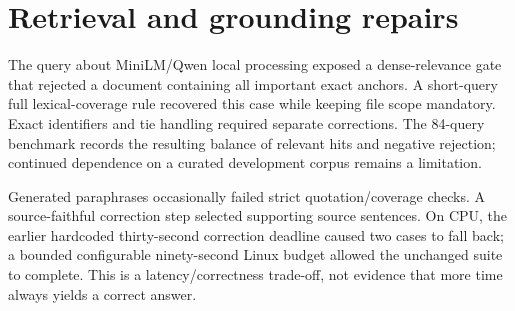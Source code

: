 \documentclass[11pt,a4paper,oneside]{report}
\begin{document}
\section{Retrieval and grounding repairs}
The query about MiniLM/Qwen local processing exposed a dense-relevance gate that rejected a document containing all important exact anchors. A short-query full lexical-coverage rule recovered this case while keeping file scope mandatory. Exact identifiers and tie handling required separate corrections. The 84-query benchmark records the resulting balance of relevant hits and negative rejection; continued dependence on a curated development corpus remains a limitation.

Generated paraphrases occasionally failed strict quotation/coverage checks. A source-faithful correction step selected supporting source sentences. On CPU, the earlier hardcoded thirty-second correction deadline caused two cases to fall back; a bounded configurable ninety-second Linux budget allowed the unchanged suite to complete. This is a latency/correctness trade-off, not evidence that more time always yields a correct answer.
\end{document}
